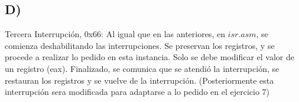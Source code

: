 \subsection*{D)}
Tercera Interrupci\'on, 0x66: \newline
 Al igual que en las anteriores, en $isr.asm$, se comienza deshabilitando las interrupciones. Se preservan los registros, y se procede a realizar lo pedido en esta instancia. Solo 
 se debe modificar el valor de un registro (eax). Finalizado, se comunica que se atendi\'o la interrupci\'on, se restauran los registros y se vuelve de la interrupci\'on. 
 (Posteriormente esta interrupci\'on sera modificada para adaptarse a lo pedido en el ejercicio 7)
 
